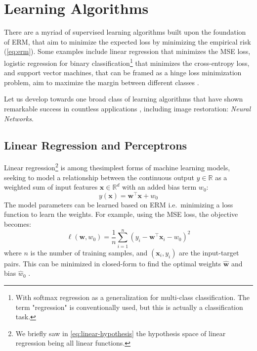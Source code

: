 \section{Learning Algorithms}
There are a myriad of supervised learning algorithms built upon the foundation of \gls{ERM}, that aim to minimize the expected loss by minimizing the empirical risk (\cref{eq:erm}). Some examples include linear regression that minimizes the \gls{MSE} loss, logistic regression for binary classification\footnote{With softmax regression as a generalization for multi-class classification. The term "regression" is conventionally used, but this is actually a classification task.} that minimizes the cross-entropy loss, and support vector machines, that can be framed as a hinge loss minimization problem, aim to maximize the margin between different classes \cite{bishopPatternRecognitionMachine2006}.

Let us develop towards one broad class of learning algorithms that have shown remarkable success in countless applications , including image restoration: \textit{Neural Networks}.

\subsection{Linear Regression and Perceptrons}
Linear regression\footnote{We briefly saw in \cref{eq:linear-hypothesis} the hypothesis space of linear regression being all linear functions.} is among thesimplest forms of machine learning models, seeking to model a relationship between the continuous output $y \in \mathbb{R}$ as a weighted sum of input features $\mathbf{x} \in \mathbb{R}^d$ with an added bias term $w_0$:
\begin{equation}\label{eq:linear-regression}
    y(\mathbf{x}) = \mathbf{w}^\top \mathbf{x} + w_0
\end{equation}
The model parameters can be learned based on \gls{ERM} i.e.\ minimizing a loss function to learn the weights. For example, using the \gls{MSE} loss, the objective becomes:
\begin{equation}\label{eq:mse-loss}
    \ell(\mathbf{w}, w_0) = \frac{1}{n} \sum_{i=1}^{n} (y_i - \mathbf{w}^\top \mathbf{x}_i - w_0)^2
\end{equation}
where $n$ is the number of training samples, and $(\mathbf{x}_i, y_i)$ are the input-target pairs. This can be minimized in closed-form to find the optimal weights $\hat{\mathbf{w}}$ and bias $\hat{w}_0$ \cite{bishopPatternRecognitionMachine2006}.

